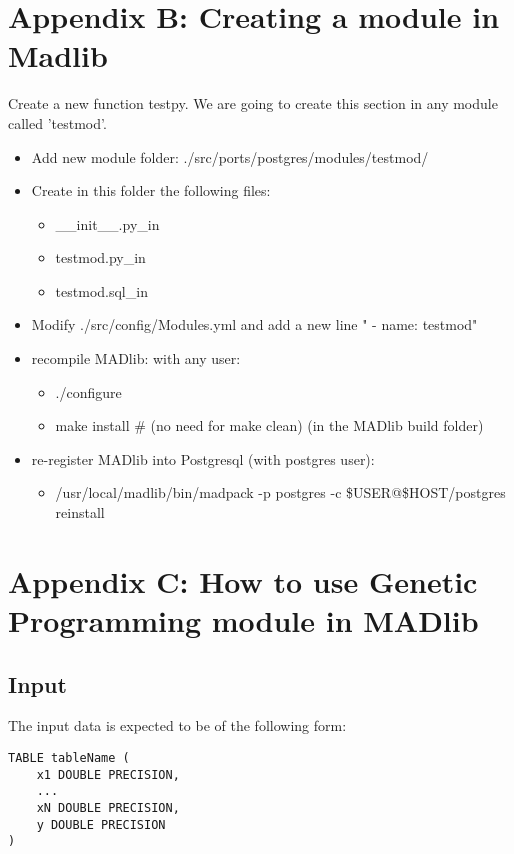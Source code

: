 \section*{Appendix B: Creating a module in Madlib}

Create a new function testpy. We are going to create this section in any module called 'testmod'.

\begin{itemize}
  \item Add new module folder: ./src/ports/postgres/modules/testmod/
  \item Create in this folder the following files:

\begin{itemize}
  \item \_\_init\_\_.py\_in  
  \item testmod.py\_in
  \item testmod.sql\_in
\end{itemize}

\item Modify ./src/config/Modules.yml and add a new line "	- name: testmod"
  \item recompile MADlib: with any user:

\begin{itemize}
  \item ./configure
  \item make install      \# (no need for make clean) (in the MADlib build folder)
\end{itemize}
  \item re-register MADlib into Postgresql (with postgres user):
  \begin{itemize}
  \item  /usr/local/madlib/bin/madpack -p postgres -c \$USER@\$HOST/postgres reinstall
  \end{itemize}
 \end{itemize}
 


\section*{Appendix C: How to use Genetic Programming module in MADlib}
\subsection*{Input}
The input data is expected to be of the following form:
\begin{verbatim}
TABLE tableName (
    x1 DOUBLE PRECISION,
    ...
    xN DOUBLE PRECISION,
    y DOUBLE PRECISION
)
\end{verbatim}

